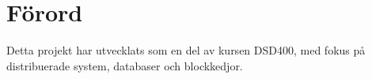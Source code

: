 \thispagestyle{plain}

\section{Förord}
Detta projekt har utvecklats som en del av kursen DSD400, med fokus på distribuerade system, databaser och blockkedjor. 